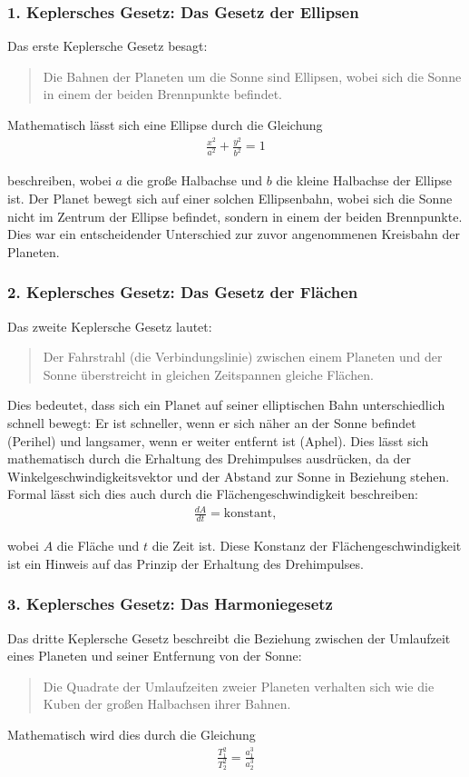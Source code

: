 \documentclass[a4paper,12pt,twoside]{article}
\begin{document}
\subsubsection{1. Keplersches Gesetz: Das Gesetz der Ellipsen}
Das erste Keplersche Gesetz besagt:
\begin{quote}
    Die Bahnen der Planeten um die Sonne sind Ellipsen, wobei sich die Sonne in einem der beiden Brennpunkte befindet.
\end{quote}
Mathematisch lässt sich eine Ellipse durch die Gleichung
\begin{align*}
	\frac{x^2}{a^2} + \frac{y^2}{b^2} = 1
\end{align*}

beschreiben, wobei \(a\) die große Halbachse und \(b\) die kleine Halbachse der Ellipse ist. Der Planet bewegt sich auf einer solchen Ellipsenbahn, wobei sich die Sonne nicht im Zentrum der Ellipse befindet, sondern in einem der beiden Brennpunkte. Dies war ein entscheidender Unterschied zur zuvor angenommenen Kreisbahn der Planeten.
\subsubsection{2. Keplersches Gesetz: Das Gesetz der Flächen}
Das zweite Keplersche Gesetz lautet:

\begin{quote}
    Der Fahrstrahl (die Verbindungslinie) zwischen einem Planeten und der Sonne überstreicht in gleichen Zeitspannen gleiche Flächen.
\end{quote}
Dies bedeutet, dass sich ein Planet auf seiner elliptischen Bahn unterschiedlich schnell bewegt: Er ist schneller, wenn er sich näher an der Sonne befindet (Perihel) und langsamer, wenn er weiter entfernt ist (Aphel). Dies lässt sich mathematisch durch die Erhaltung des Drehimpulses ausdrücken, da der Winkelgeschwindigkeitsvektor und der Abstand zur Sonne in Beziehung stehen. Formal lässt sich dies auch durch die Flächengeschwindigkeit beschreiben:
\begin{align*}
	\frac{dA}{dt} = \text{konstant},
\end{align*}

wobei \(A\) die Fläche und \(t\) die Zeit ist. Diese Konstanz der Flächengeschwindigkeit ist ein Hinweis auf das Prinzip der Erhaltung des Drehimpulses.

\subsubsection{3. Keplersches Gesetz: Das Harmoniegesetz}
Das dritte Keplersche Gesetz beschreibt die Beziehung zwischen der Umlaufzeit eines Planeten und seiner Entfernung von der Sonne:
\begin{quote}
    Die Quadrate der Umlaufzeiten zweier Planeten verhalten sich wie die Kuben der großen Halbachsen ihrer Bahnen.
\end{quote}
Mathematisch wird dies durch die Gleichung
\begin{align*}
	\frac{T_1^2}{T_2^2} = \frac{a_1^3}{a_2^3}
\end{align*}
\end{document}
